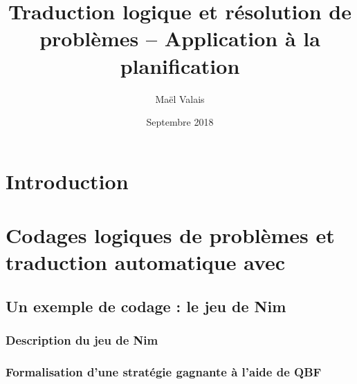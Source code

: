 \documentclass[a4paper,12pt,oneside]{extbook}
\title{Traduction logique et résolution de problèmes -- Application à la planification}
\author{Maël Valais}
\date{Septembre 2018}
\begin{document}
\tableofcontents

\chapter{Introduction}\label{chap:intro}




\chapter{Codages logiques de problèmes et traduction automatique avec \touist}\label{chap:codages}


\section{Un exemple de codage : le jeu de Nim}
\subsection{Description du jeu de Nim}

\subsection{Formalisation d'une stratégie gagnante à l'aide de QBF}


\end{document}
